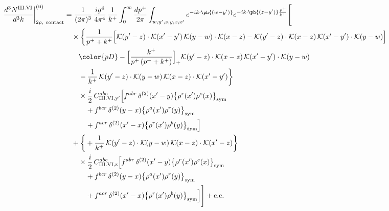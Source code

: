 \begin{align}
\frac{d^{3}N^{\rm III.VI}}{d^{3}k}\bigg|^{\rm (ii)}_{2\rho,\ {\rm contact}}&=\frac{1}{(2\pi)^{3}}\,\frac{ig^{4}}{4\pi^{4}}\,\frac{1}{k^{+}}\int_{0}^{\infty}\frac{dp^{+}}{2\pi}\int_{w,y',z,y,x,x'}e^{-ik\cdot\ph{(w-y')}}e^{-ik\cdot\ph{(z-y')}\frac{p^{+}}{k^{+}}}\Bigg[\notag\\
&\quad\times\bigg\{\frac{1}{p^{+}+k^{+}}\Big[\mathcal{K}(y'-z)\cdot\mathcal{K}(x'-y')\,\mathcal{K}(y-w)\cdot\mathcal{K}(x-z)-\mathcal{K}(y'-z)\cdot\mathcal{K}(x-z)\,\mathcal{K}(x'-y')\cdot\mathcal{K}(y-w)\Big]\notag\\
&\qquad{\color{pD}-\Big[\frac{k^{+}}{p^{+}\,(p^{+}+k^{+})}\Big]_{+}\mathcal{K}(y'-z)\cdot\mathcal{K}(x-z)\,\mathcal{K}(x'-y')\cdot\mathcal{K}(y-w)}\notag\\
&\qquad-\frac{1}{k^{+}}\,\mathcal{K}(y'-z)\cdot\mathcal{K}(y-w)\,\mathcal{K}(x-z)\cdot\mathcal{K}(x'-y')\bigg\}\notag\\
&\qquad\times \frac{i}{2}\,C^{abc}_{{\rm III.VI,y'}}\Big[f^{abr}\,\delta^{(2)}(x'-y)\big\{\rho^{r}(x')\rho^{c}(x)\big\}_{\rm sym}\notag\\
&\qquad\quad +f^{bcr}\,\delta^{(2)}(y-x)\big\{\rho^{a}(x')\rho^{r}(y)\big\}_{\rm sym}\notag\\
&\qquad\quad +f^{acr}\,\delta^{(2)}(x'-x)\big\{\rho^{r}(x')\rho^{b}(y)\big\}_{\rm sym}\Big]\notag\\
&\quad+\bigg\{+\frac{1}{k^{+}}\,\mathcal{K}(y'-z)\cdot\mathcal{K}(y-w)\,\mathcal{K}(x-z)\cdot\mathcal{K}(x'-z)\bigg\}\notag\\
&\qquad\times \frac{i}{2}\,C^{abc}_{{\rm III.VI,z}}\Big[f^{abr}\,\delta^{(2)}(x'-y)\big\{\rho^{r}(x')\rho^{c}(x)\big\}_{\rm sym}\notag\\
&\qquad\quad +f^{bcr}\,\delta^{(2)}(y-x)\big\{\rho^{a}(x')\rho^{r}(y)\big\}_{\rm sym}\notag\\
&\qquad\quad +f^{acr}\,\delta^{(2)}(x'-x)\big\{\rho^{r}(x')\rho^{b}(y)\big\}_{\rm sym}\Big]\Bigg]+{\rm c.c.}\label{eq:D-III.VI-2}
\end{align}

